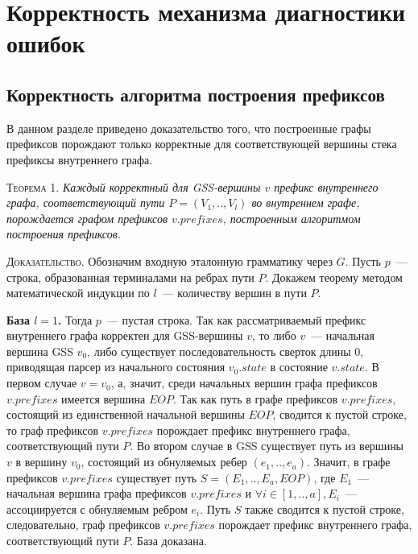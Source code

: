 \section{Корректность механизма диагностики ошибок}
\subsection{Корректность алгоритма построения префиксов}
В данном разделе приведено доказательство того, что построенные графы префиксов порождают только корректные для соответствующей вершины стека префиксы внутреннего графа. 

\textsc{Теорема 1.} 
\textit{Каждый корректный для GSS-вершины $v$ префикс внутреннего графа, соответствующий пути $P = (V_{1},..,V_{l})$ во внутреннем графе, порождается графом префиксов $v.prefixes$, построенным алгоритмом построения префиксов.}

\textsc{Доказательство.}
Обозначим входную эталонную грамматику через $G$. Пусть $p$~--- строка, образованная терминалами на ребрах пути $P$. Докажем теорему методом математической индукции по $l$~--- количеству вершин в пути $P$.

\textbf{База $l = 1$.} Тогда $p$~--- пустая строка. Так как рассматриваемый префикс внутреннего графа корректен для GSS-вершины $v$, то либо $v$~--- начальная вершина GSS $v_{0}$, либо существует последовательность сверток длины 0, приводящая парсер из начального состояния $v_{0}.state$ в состояние $v.state$. В первом случае $v = v_{0}$, а, значит, среди начальных вершин графа префиксов $v.prefixes$ имеется вершина $EOP$. Так как путь в графе префиксов $v.prefixes$, состоящий из единственной начальной вершины $EOP$, сводится к пустой строке, то граф префиксов $v.prefixes$ порождает префикс внутреннего графа, соответствующий пути $P$. Во втором случае в GSS существует путь из вершины $v$ в вершину $v_{0}$, состоящий из обнуляемых ребер $(e_{1},..,e_{a})$. Значит, в графе префиксов $v.prefixes$ существует путь $S = (E_{1},..,E_{a}, EOP)$, где $E_{1}$~--- начальная вершина графа префиксов $v.prefixes$ и $\forall i \in [1,..,a], E_{i}$~--- ассоциируется с обнуляемым ребром  $e_{i}$. Путь $S$ также сводится к пустой строке, следовательно, граф префиксов $v.prefixes$ порождает префикс внутреннего графа, соответствующий пути $P$. База доказана.
% 

